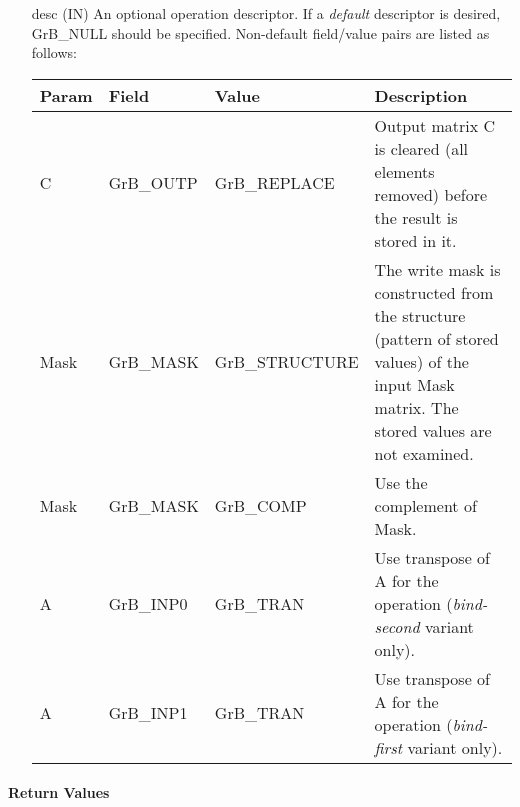\begin{itemize}[leftmargin=1.1in]
    \item[{\sf desc}] ({\sf IN}) An optional operation descriptor. If
    a \emph{default} descriptor is desired, {\sf GrB\_NULL} should be
    specified. Non-default field/value pairs are listed as follows:  \\

    \hspace*{-2em}\begin{tabular}{lllp{2.7in}}
        Param & Field  & Value & Description \\
        \hline
        {\sf C}    & {\sf GrB\_OUTP} & {\sf GrB\_REPLACE} & Output matrix {\sf C}
        is cleared (all elements removed) before the result is stored in it.\\

        {\sf Mask} & {\sf GrB\_MASK} & {\sf GrB\_STRUCTURE}   & The write mask is
        constructed from the structure (pattern of stored values) of the input
        {\sf Mask} matrix. The stored values are not examined.\\

        {\sf Mask} & {\sf GrB\_MASK} & {\sf GrB\_COMP}   & Use the 
        complement of {\sf Mask}. \\

        {\sf A}    & {\sf GrB\_INP0} & {\sf GrB\_TRAN}   & Use transpose of {\sf A}
        for the operation ({\em bind-second} variant only). \\

        {\sf A}    & {\sf GrB\_INP1} & {\sf GrB\_TRAN}   & Use transpose of {\sf A}
        for the operation ({\em bind-first} variant only). \\
    \end{tabular}
\end{itemize}

\paragraph{Return Values}


